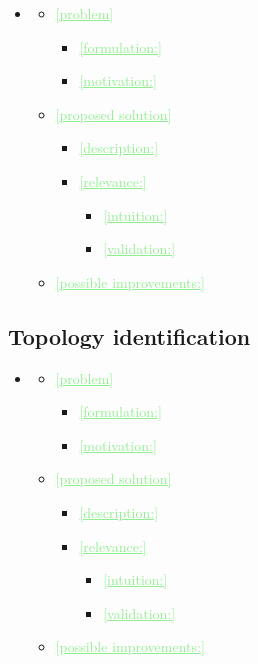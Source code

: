 \documentclass[11pt,final,onecolumn]{IEEEtran}
\newcommand{\cmt}[1]{\noindent\textcolor{lightgreen}{\underline{[#1]}}} %
\newcommand{\cmt}[1]{} %
\begin{document}
\begin{itemize}
\item \cite{mei2017causal}
      \begin{itemize}
    \item\cmt{problem}
      \begin{itemize}
      \item\cmt{formulation:}
      \item\cmt{motivation:}
      \end{itemize}      
    \item\cmt{proposed solution}
      \begin{itemize}
      \item\cmt{description:}
      \item\cmt{relevance:}
        \begin{itemize}
        \item\cmt{intuition:}
        \item\cmt{validation:}
        \end{itemize}      
      \end{itemize}
    \item\cmt{possible improvements:}
    \end{itemize}
  
 
\end{itemize}

\subsection{Topology identification}

\begin{itemize}
\item \cite{granger1988causality}
      \begin{itemize}
    \item\cmt{problem}
      \begin{itemize}
      \item\cmt{formulation:}
      \item\cmt{motivation:}
      \end{itemize}      
    \item\cmt{proposed solution}
      \begin{itemize}
      \item\cmt{description:}
      \item\cmt{relevance:}
        \begin{itemize}
        \item\cmt{intuition:}
        \item\cmt{validation:}
        \end{itemize}      
      \end{itemize}
    \item\cmt{possible improvements:}
    \end{itemize}

\end{itemize}
\end{document}
